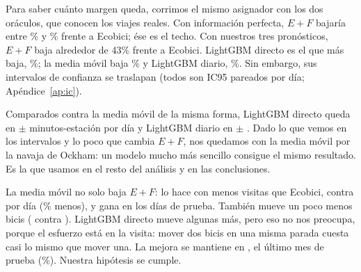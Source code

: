 \documentclass[conference,letterpaper,10pt]{IEEEtran}
\newcommand{\EF}{E+F}
\begin{document}
Para saber cuánto margen queda, corrimos el mismo asignador con los dos oráculos, que conocen los viajes reales. Con información perfecta, $\EF$ bajaría entre \rorDPct\% y \rorDirPct\% frente a Ecobici; ése es el techo. Con nuestros tres pronósticos, $\EF$ baja alrededor de 43\% frente a Ecobici. LightGBM directo es el que más baja, \rlgbmDirPct\%; la media móvil baja \rmaPct\% y LightGBM diario, \rlgbmDPct\%. Sin embargo, sus intervalos de confianza se traslapan (todos son IC95 pareados por día; Apéndice~\ref{ap:ic}).

Comparados contra la media móvil de la misma forma, LightGBM directo queda en \rlgbmDirVsMa{} $\pm$ \rlgbmDirVsMaIC{} minutos-estación por día y LightGBM diario en \rlgbmDVsMa{} $\pm$ \rlgbmDVsMaIC. Dado lo que vemos en los intervalos y lo poco que cambia $\EF$, nos quedamos con la media móvil por la navaja de Ockham: un modelo mucho más sencillo consigue el mismo resultado. Es la que usamos en el resto del análisis y en las conclusiones.

La media móvil no solo baja $\EF$: lo hace con menos visitas que Ecobici, \rmaVis{} contra \recoVis{} por día (\rmaVisPct\% menos), y gana en los \rmaGana{} días de prueba. También mueve un poco menos bicis (\rmaBicis{} contra \recoBicis). LightGBM directo mueve algunas más, pero eso no nos preocupa, porque el esfuerzo está en la visita: mover dos bicis en una misma parada cuesta casi lo mismo que mover una. La mejora se mantiene en \rdicMes, el último mes de prueba (\rdicPct\%). Nuestra hipótesis se cumple.

\begin{table}[!htb]
\centering\footnotesize
\caption{Medias por día en \rdias{} días de prueba, con $n=\rnDiario$ horas en los cinco brazos con asignador. $E$, $F$ y $\EF$ en minutos-estación; Desv.: viajes desviados por cada 100 salidas; m/desv.: distancia media de un desvío. Última columna: reducción de $\EF$ frente a Ecobici, con IC95 pareado por día (Apéndice~\ref{ap:ic}), en porcentaje del $\EF$ medio de Ecobici.}
\label{tab:principal}

\end{table}

\begin{table}[!htb]
\centering\footnotesize
\setlength{\tabcolsep}{1.6pt}
\caption{Costo por kilómetro ($\alpha$, minutos-estación por km) en los \caDias{} días de prueba, con la media móvil y la misma $n$ y $\lambda$; con $\alpha>0$, con el tope duro de \tfLimMin{} minutos por tramo. Medias por día; $\EF$ en minutos-estación; visitas: estaciones visitadas; km de tramos: suma, en línea recta, de cada tramo donante $\to$ receptor; desvíos: viajes desviados por día. Columnas vs.: cambio en porcentaje frente a $\alpha=0$ y frente a Ecobici. Los km de Ecobici son una cota inferior (Apéndice~\ref{ap:tramos}).}
\label{tab:alfa}

\end{table}
\end{document}
